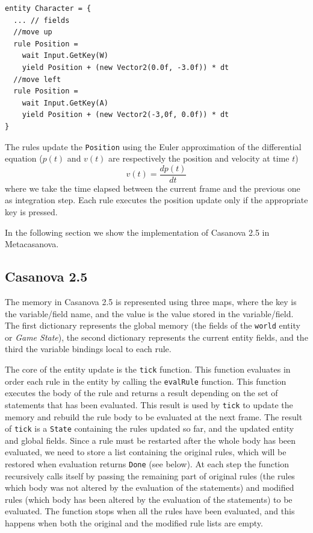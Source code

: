 \begin{lstlisting}
entity Character = {
  ... // fields
  //move up
  rule Position = 
    wait Input.GetKey(W)
    yield Position + (new Vector2(0.0f, -3.0f)) * dt
  //move left
  rule Position = 
    wait Input.GetKey(A)
    yield Position + (new Vector2(-3,0f, 0.0f)) * dt
}
\end{lstlisting}
The rules update the \texttt{Position} using the Euler approximation of the differential equation ($p(t)$ and $v(t)$ are respectively the position and velocity at time $t$)
$$
v(t) = \dfrac{dp(t)}{dt}
$$
where we take the time elapsed between the current frame and the previous one as integration step. Each rule executes the position update only if the appropriate key is pressed.

In the following section we show the implementation of Casanova 2.5 in Metacasanova.

\subsection{Casanova 2.5}
The memory in Casanova 2.5 is represented using three maps, where the key is the variable/field name, and the value is the value stored in the variable/field. The first dictionary represents the global memory (the fields of the \texttt{world} entity or \textit{Game State}), the second dictionary represents the current entity fields, and the third the variable bindings local to each rule.

The core of the entity update is the \texttt{tick} function. This function evaluates in order each rule in the entity by calling the \texttt{evalRule} function. This function executes the body of the rule and returns a result depending on the set of statements that has been evaluated. This result is used by \texttt{tick} to update the memory and rebuild the rule body to be evaluated at the next frame. The result of \texttt{tick} is a \texttt{State} containing the rules updated so far, and the updated entity and global fields. Since a rule must be restarted after the whole body has been evaluated, we need to store a list containing the original rules, which will be restored when evaluation returns \texttt{Done} (see below). At each step the function recursively calls itself by passing the remaining part of original rules (the rules which body was not altered by the evaluation of the statements) and modified rules (which body has been altered by the evaluation of the statements) to be evaluated. The function stops when all the rules have been evaluated, and this happens when both the original and the modified rule lists are empty.

